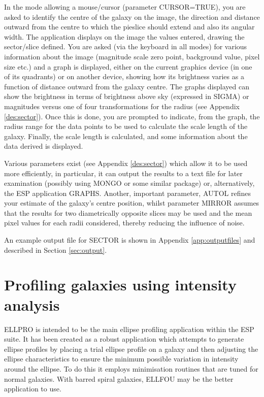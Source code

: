 \documentclass[twoside,11pt]{article}
\newcommand{\xlabel}[1]{}
\begin{document}
In the mode allowing a mouse/cursor (parameter CURSOR=TRUE), you are
asked to identify the centre of the galaxy on the image, the direction 
and distance outward from the centre to which the pieslice should 
extend and also its angular width. The application displays on the image
the values entered, drawing the sector/slice defined. You are asked 
(via the keyboard in all modes) for various information about the image 
(magnitude scale zero point, background value, pixel size etc.) and a graph 
is displayed, either on the current graphics device (in one of its quadrants) 
or on another device, showing how its brightness varies as a 
function of distance outward from the galaxy centre. The graphs displayed 
can show the brightness in terms of brightness above sky (expressed in SIGMA)
or magnitudes versus one of four transformations for the radius 
(see Appendix \ref{des:sector}). Once this is done, you are prompted to 
indicate, from the graph, 
the radius range for the data points to be used to calculate the scale 
length of the galaxy. Finally, the scale length is calculated,
and some information about the data derived is displayed. 

Various parameters exist (see Appendix \ref{des:sector}) which allow it 
to be used more
efficiently, in particular, it can output the results to a text 
file for later examination (possibly using MONGO or some similar package) or,
alternatively, the ESP application GRAPHS. Another, important parameter, AUTOL 
refines your estimate of the galaxy's centre position, whilst parameter 
MIRROR assumes that the results for two diametrically opposite slices may
be used and the mean pixel values for each radii considered, thereby reducing 
the influence of noise. 

An example output file for SECTOR is shown in Appendix \ref{app:outputfiles}
and described in Section \ref{sec:output}.


\section{Profiling galaxies using intensity analysis}
\xlabel{ELLPRO}
\label{sec:profi}

ELLPRO is intended to be the main ellipse profiling application within the 
ESP suite. It has been created as a robust application which attempts to 
generate ellipse profiles by placing a trial ellipse profile on a 
galaxy and then adjusting the ellipse characteristics to ensure the 
minimum possible variation in intensity around the ellipse.
To do this it employs minimisation routines that are  
tuned for normal galaxies. With barred spiral galaxies, ELLFOU may be the
better application to use. 
\end{document}
